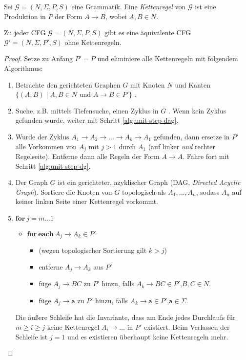 {\begin{Def}
  Sei $\mathcal{G} = (N, \Sigma, P, S)$ eine Grammatik.
  Eine \emph{Kettenregel} von $\mathcal{G}$ ist eine Produktion in $P$ der Form $A \to B$, wobei $A,B \in N$.
\end{Def}

\begin{lemma}
  Zu jeder CFG $\mathcal{G} = (N, \Sigma, P, S)$ gibt es eine äquivalente CFG $\mathcal{G}' = (N, \Sigma, P', S)$ ohne Kettenregeln.
\end{lemma}
\begin{proof}
  Setze zu Anfang $P' = P$ und eliminiere alle Kettenregeln mit folgendem Algorithmus:
  \begin{enumerate}
  \item Betrachte den gerichteten Graphen $G$ mit Knoten $N$ und Kanten $\{(A, B) \mid A,B \in N \text{ und } A \to B \in P' \}$ \label{alg:unit-step-dg}.
  \item Suche, z.B. mittels Tiefensuche, einen Zyklus in $G$ .
    Wenn kein Zyklus gefunden wurde, weiter mit Schritt \ref{alg:unit-step-dag}.
  \item Wurde der Zyklus $A_1 \to A_2 \to \ldots \to A_k \to A_1$ gefunden, dann ersetze in $P'$ alle Vorkommen von $A_j$ mit $j > 1$ durch $A_1$ (auf linker \emph{und} rechter Regelseite).
    Entferne dann alle Regeln der Form $A \to A$.
    Fahre fort mit Schritt \ref{alg:unit-step-dg}.
  \item \label{alg:unit-step-dag}
    Der Graph $G$ ist ein gerichteter, azyklischer Graph (DAG, \emph{Directed Acyclic Graph}).
    Sortiere die Knoten von $G$ topologisch als $A_1, \ldots, A_n$, sodass $A_n$ auf keiner linken Seite einer Kettenregel vorkommt.
  \item $\mathbf{for}~j = m \ldots 1$
    \begin{itemize}
    \item[] $\mathbf{for}~\mathbf{each}~A_j \to A_k \in P'$
      \begin{itemize}
      \item[] (wegen topologischer Sortierung gilt $k > j$)
      \item[] entferne $A_j \to A_k$ aus $P'$
      \item[] füge $A_j \to BC$ zu $P'$ hinzu, falls $A_k \to BC \in P'$,\quad $B,C \in N$.
      \item[] füge $A_j \to \mathtt{a}$ zu $P'$ hinzu, falls $A_k \to \mathtt{a} \in P'$,\quad $\mathtt{a} \in \Sigma$.
      \end{itemize}
    \end{itemize}
    Die äußere Schleife hat die Invariante, dass am Ende jedes Durchlaufs für $m \ge i \ge j$ keine Kettenregel $A_i \to \ldots$ in $P'$ existiert.
    Beim Verlassen der Schleife ist $j = 1$ und es existieren überhaupt keine Kettenregeln mehr.
  \end{enumerate}
\end{proof}


}
